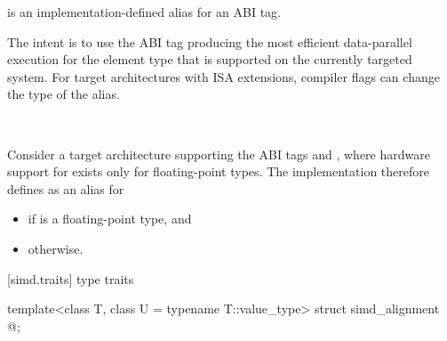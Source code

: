 
\pnum
{} is an implementation-defined alias for an ABI tag.
\begin{note}
The intent is to use the ABI tag producing the most efficient data-parallel
execution for the element type  that is supported on the currently
targeted system.
For target architectures with ISA extensions, compiler flags can change the
type of the  alias.
\end{note}\\
\begin{example}
  Consider a target architecture supporting the ABI tags
   and , where hardware support for
   exists only for floating-point types.
  The implementation therefore defines  as an alias for
  \begin{itemize}
    \item {} if  is a floating-point type, and
    \item {} otherwise.
  \end{itemize}
\end{example}

[simd.traits]{ type traits}

\begin{itemdecl}
template<class T, class U = typename T::value_type> struct simd_alignment { @\seebelow@ };
\end{itemdecl}


